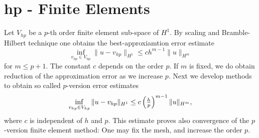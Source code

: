 








% 


\section{hp - Finite Elements}

Let $V_{hp}$ be a $p$-th order finite element sub-space of $H^1$.
By scaling and Bramble-Hilbert technique one obtains the best-approxiamtion error estimate
$$
\inf_{v_{hp} \in V_{hp}} \| u - v_{hp} \|_{H^1}  \leq c h^{m-1} \| u \|_{H^m}
$$
for $m \leq p+1$. The constant $c$ depends on the order $p$. If $m$ is fixed, we do obtain reduction of the approximation error as we increase $p$. Next we develop methods to obtain so called $p$-version error estimates 
$$
\inf_{v_{hp} \in V_{hp}} \| u - v_{hp} \|_{H^1}  \leq c \left( { \textstyle \frac{h}{p} } \right) ^{m-1} \| u \|_{H^m},
$$
where $c$ is independent of $h$ and $p$. This estimate proves also convergence of the $p$-version finite element method: One may fix the mesh, and increase the order $p$. 

